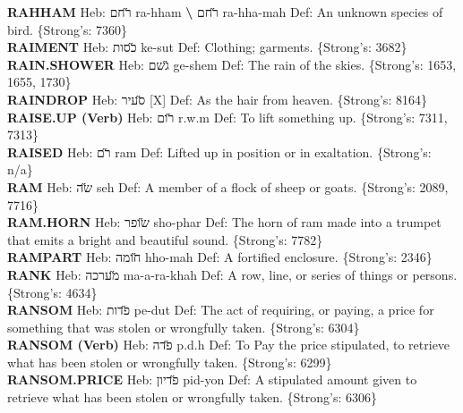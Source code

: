 {\textbf{RAHHAM} Heb: {\large\H רחם} ra-hham \textbf{\textbackslash{}} {\large\H רחם} ra-hha-mah Def: An unknown species of bird. \{Strong's: 7360\}\hfill{}\\

\textbf{RAIMENT} Heb: {\large\H כסות} ke-sut Def: Clothing; garments. \{Strong's: 3682\}\hfill{}\\

\textbf{RAIN.SHOWER} Heb: {\large\H גשם} ge-shem Def: The rain of the skies. \{Strong's: 1653, 1655, 1730\}\hfill{}\\

\textbf{RAINDROP} Heb: {\large\H סעיר} {[}X{]} Def: As the hair from heaven. \{Strong's: 8164\}\hfill{}\\

\textbf{RAISE.UP (Verb)} Heb: {\large\H רום} r.w.m Def: To lift something up. \{Strong's: 7311, 7313\}\hfill{}\\

\textbf{RAISED} Heb: {\large\H רם} ram Def: Lifted up in position or in exaltation. \{Strong's: n/a\}\hfill{}\\

\textbf{RAM} Heb: {\large\H שה} seh Def: A member of a flock of sheep or goats. \{Strong's: 2089, 7716\}\hfill{}\\

\textbf{RAM.HORN} Heb: {\large\H שופר} sho-phar Def: The horn of ram made into a trumpet that emits a bright and beautiful sound. \{Strong's: 7782\}\hfill{}\\

\textbf{RAMPART} Heb: {\large\H חומה} hho-mah Def: A fortified enclosure. \{Strong's: 2346\}\hfill{}\\

\textbf{RANK} Heb: {\large\H מערכה} ma-a-ra-khah Def: A row, line, or series of things or persons. \{Strong's: 4634\}\hfill{}\\

\textbf{RANSOM} Heb: {\large\H פדות} pe-dut Def: The act of requiring, or paying, a price for something that was stolen or wrongfully taken. \{Strong's: 6304\}\hfill{}\\

\textbf{RANSOM (Verb)} Heb: {\large\H פדה} p.d.h Def: To Pay the price stipulated, to retrieve what has been stolen or wrongfully taken. \{Strong's: 6299\}\hfill{}\\

\textbf{RANSOM.PRICE} Heb: {\large\H פדיון} pid-yon Def: A stipulated amount given to retrieve what has been stolen or wrongfully taken. \{Strong's: 6306\}\hfill{}\\

}
